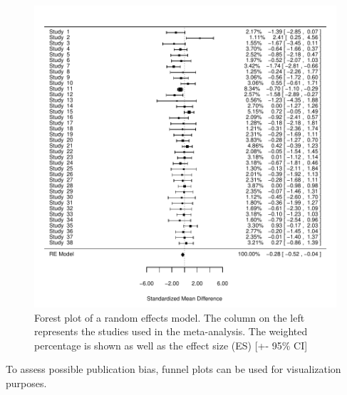 \documentclass[11pt, a4paper]{article} %
\begin{document}
\begin{figure}
\captionsetup{width=0.6\textwidth}
\centering
\includegraphics{newsweave-forest_re}

\caption{Forest plot of a random effects model. The column on the left represents the studies used in the meta-analysis. The weighted percentage is shown as well as the effect size (ES) [+- 95\% CI]}
\end{figure}


To assess possible publication bias, funnel plots can be used for visualization purposes.\\
\end{document}
